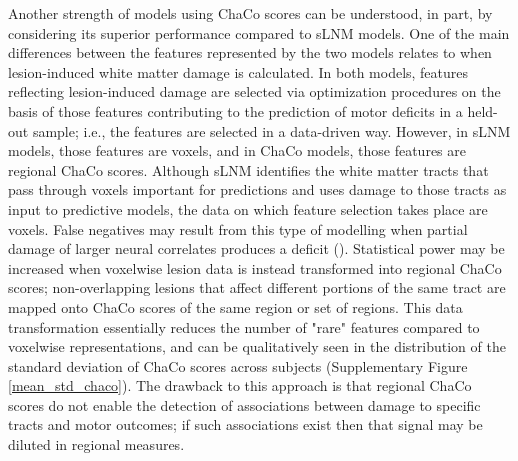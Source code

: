 \documentclass[phd,tocprelim]{cornell}
\begin{document}
Another strength of models using ChaCo scores can be understood, in part, by considering its superior performance compared to sLNM models. One of the main differences between the features represented by the two models relates to when lesion-induced white matter damage is calculated. In both models, features reflecting lesion-induced damage are selected via optimization procedures on the basis of those features contributing to the prediction of motor deficits in a held-out sample; i.e., the features are selected in a data-driven way. However, in sLNM models, those features are voxels, and in ChaCo models, those features are regional ChaCo scores. Although sLNM identifies the white matter tracts that pass through voxels important for predictions and uses damage to those tracts as input to predictive models, the data on which feature selection takes place are voxels. False negatives may result from this type of modelling when partial damage of larger neural correlates produces a deficit (\cite{Sperber2022-oj}). Statistical power may be increased when voxelwise lesion data is instead transformed into regional ChaCo scores; non-overlapping lesions that affect different portions of the same tract are mapped onto ChaCo scores of the same region or set of regions. This data transformation essentially reduces the number of "rare" features compared to voxelwise representations, and can be qualitatively seen in the distribution of the standard deviation of ChaCo scores across subjects (Supplementary Figure \ref{mean_std_chaco}). The drawback to this approach is that regional ChaCo scores do not enable the detection of associations between damage to specific tracts and motor outcomes; if such associations exist then that signal may be diluted in regional measures. 
\end{document}
